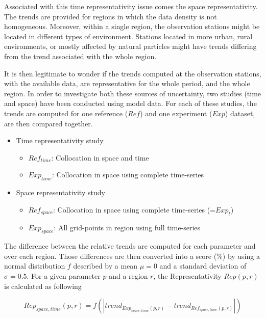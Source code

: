 \documentclass[journal abbreviation, manuscript]{copernicus}
\begin{document}
Associated with this time representativity issue comes the space representativity. The trends are provided for regions in which the data density is not homogeneous. Moreover, within a single region, the observation stations might be located in different types of environment. Stations located in more urban, rural environments, or mostly affected by natural particles might have trends differing from the trend associated with the whole region.

It is then legitimate to wonder if the trends computed at the observation stations, with the available data, are representative for the whole period, and the whole region. In order to investigate both these sources of uncertainty, two studies (time and space) have been conducted using model data. For each of these studies, the trends are computed for one reference ($Ref$) and one experiment ($Exp$) dataset, are then compared together.
\begin{itemize}
 \item Time representativity study
       \begin{itemize}
        \item $Ref_{time}$: Collocation in space and time
        \item $Exp_{time}$: Collocation in space using complete time-series
       \end{itemize}
 \item Space representativity study
       \begin{itemize}
        \item $Ref_{space}$: Collocation in space using complete time-series (=$Exp_{t}$)
        \item $Exp_{space}$: All grid-points in region using full time-series
       \end{itemize}
\end{itemize}

The difference between the relative trends are computed for each parameter and over each region. Those differences are then converted into a score (\unit{\%}) by using a normal distribution $f$ described by a mean $\mu=0$ and a standard deviation of $\sigma=0.5$. For a given parameter $p$ and a region $r$, the Representativity $Rep(p,r)$ is calculated as following

\begin{equation}
 Rep_{space,time}(p, r) = {f\left(\left| trend_{Exp_{space,time}(p, r)}-trend_{Ref_{space,time}(p, r)} \right|\right)}
\end{equation}
\end{document}
